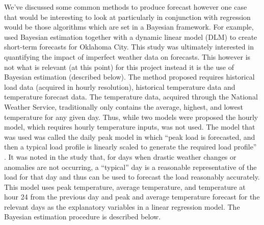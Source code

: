 \documentclass[a4paper]{article}
\begin{document}
We've discussed some common methods to produce forecast however one case that would be interesting to look at particularly in conjunction with regression would be those algorithms which are set in a Bayesian framework. For example,  \citet{douglas98} used Bayesian estimation together with a dynamic linear model (DLM) to create short-term forecasts for Oklahoma City. This study was ultimately interested in quantifying the impact of imperfect weather data on forecasts. This however is not what is relevant (at this point) for this project instead it is the use of Bayesian estimation (described below). The method proposed requires historical load data (acquired in hourly resolution), historical temperature data and temperature forecast data. The temperature data, acquired through the National Weather Service, traditionally only contains the average, highest, and lowest temperature for any given day. Thus, while two models were proposed the hourly model, which requires hourly temperature inputs, was not used. The model that was used was called the daily peak model in which ``peak load is forecasted, and then a typical load profile is linearly scaled to generate the required load profile'' \citep{douglas98}. It was noted in the study that, for days when drastic weather changes or anomalies are not occurring, a ``typical'' day is a reasonable representative of the load for that day and thus can be used to forecast the load reasonably accurately. This model uses peak temperature, average temperature, and temperature at hour 24 from the previous day and peak and average temperature forecast for the relevant days as the explanatory variables in a linear regression model. The Bayesian estimation procedure is described below.
\end{document}

